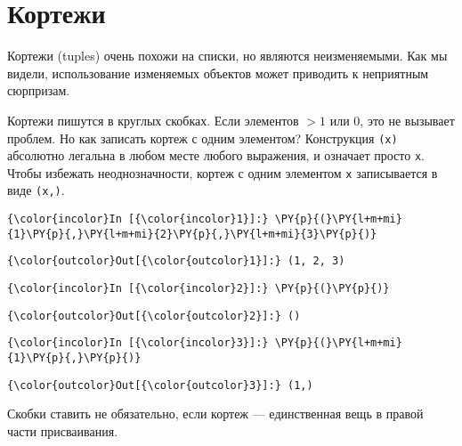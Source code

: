 \section{Кортежи}
\label{S104}

Кортежи (tuples) очень похожи на списки, но являются неизменяемыми. Как
мы видели, использование изменяемых объектов может приводить к
неприятным сюрпризам.

Кортежи пишутся в круглых скобках. Если элементов \(>1\) или 0, это не
вызывает проблем. Но как записать кортеж с одним элементом? Конструкция
\texttt{(x)} абсолютно легальна в любом месте любого выражения, и
означает просто \texttt{x}. Чтобы избежать неоднозначности, кортеж с
одним элементом \texttt{x} записывается в виде \texttt{(x,)}.

    \begin{Verbatim}[commandchars=\\\{\}]
{\color{incolor}In [{\color{incolor}1}]:} \PY{p}{(}\PY{l+m+mi}{1}\PY{p}{,}\PY{l+m+mi}{2}\PY{p}{,}\PY{l+m+mi}{3}\PY{p}{)}
\end{Verbatim}

            \begin{Verbatim}[commandchars=\\\{\}]
{\color{outcolor}Out[{\color{outcolor}1}]:} (1, 2, 3)
\end{Verbatim}
        
    \begin{Verbatim}[commandchars=\\\{\}]
{\color{incolor}In [{\color{incolor}2}]:} \PY{p}{(}\PY{p}{)}
\end{Verbatim}

            \begin{Verbatim}[commandchars=\\\{\}]
{\color{outcolor}Out[{\color{outcolor}2}]:} ()
\end{Verbatim}
        
    \begin{Verbatim}[commandchars=\\\{\}]
{\color{incolor}In [{\color{incolor}3}]:} \PY{p}{(}\PY{l+m+mi}{1}\PY{p}{,}\PY{p}{)}
\end{Verbatim}

            \begin{Verbatim}[commandchars=\\\{\}]
{\color{outcolor}Out[{\color{outcolor}3}]:} (1,)
\end{Verbatim}
        
    Скобки ставить не обязательно, если кортеж --- единственная вещь в правой
части присваивания.

